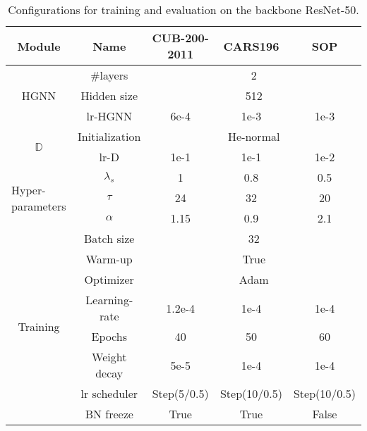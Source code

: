 \newpage

\vspace{-10mm}
\begin{table}[ht!]
\centering
\begin{tabular}{ccccc}
\toprule[0.8pt]
\textbf{Module}                                                & \textbf{Name}           & \textbf{CUB-200-2011} & \textbf{CARS196}      & \textbf{SOP}          \\ \hline \hline
\multirow{3}{*}{HGNN}                                 & \#layers       & \multicolumn{3}{c}{2}                      \\
                                                      & Hidden size    & \multicolumn{3}{c}{512}                    \\
                                                      & lr-HGNN        & 6e-4         & 1e-3         & 1e-3         \\ \hline
\multirow{2}{*}{$\mathbb{D}$}                                    & Initialization & \multicolumn{3}{c}{He-normal}              \\
                                                      & lr-D           & 1e-1         & 1e-1         & 1e-2         \\ \hline
\multicolumn{1}{l}{\multirow{3}{*}{Hyper-parameters}} & $\lambda_s$         & 1            & 0.8          & 0.5          \\
\multicolumn{1}{l}{}                                  & $\tau$            & 24           & 32           & 20           \\
\multicolumn{1}{l}{}                                  & $\alpha$          & 1.15         & 0.9          & 2.1          \\ \hline
\multirow{8}{*}{Training}                             & Batch size     & \multicolumn{3}{c}{32}                     \\
                                                      & Warm-up        & \multicolumn{3}{c}{True}                   \\
                                                      & Optimizer      & \multicolumn{3}{c}{Adam}                   \\
                                                      & Learning-rate  & 1.2e-4       & 1e-4         & 1e-4         \\
                                                      & Epochs         & 40           & 50           & 60           \\
                                                      & Weight decay   & 5e-5         & 1e-4         & 1e-4         \\
                                                      & lr scheduler   & Step(5/0.5)  & Step(10/0.5) & Step(10/0.5) \\
                                                      & BN freeze      & True         & True         & False        \\
\bottomrule[0.8pt]
\end{tabular}
\caption{Configurations for training and evaluation on the backbone ResNet-50.}
\label{training_params_ResNet}
\end{table}

